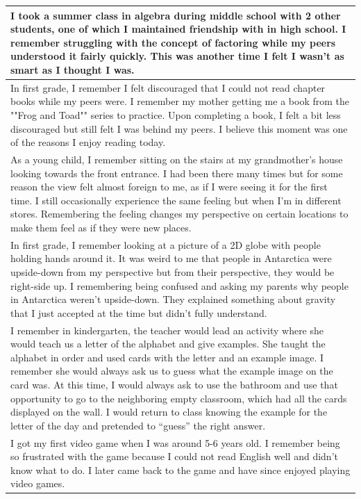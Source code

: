 \documentclass[
  .7em,
  letterpaper,
  DIV=11,
  numbers=noendperiod]{scrartcl}
\begin{document}
\begin{table}
\begin{tabular}{l}
\hline
I took a summer class in algebra during middle school with 2 other students, one of which I maintained friendship with in high school. I remember struggling with the concept of factoring while my peers understood it fairly quickly. This was another time I felt I wasn't as smart as I thought I was.\\
\hline
In first grade, I remember I felt discouraged that I could not read chapter books while my peers were. I remember my mother getting me a book from the ""Frog and Toad"" series to practice. Upon completing a book, I felt a bit less discouraged but still felt I was behind my peers. I believe this moment was one of the reasons I enjoy reading today.\\
\hline
As a young child, I remember sitting on the stairs at my grandmother's house looking towards the front entrance. I had been there many times but for some reason the view felt almost foreign to me, as if I were seeing it for the first time. I still occasionally experience the same feeling but when I'm in different stores. Remembering the feeling changes my perspective on certain locations to make them feel as if they were new places.\\
\hline
In first grade, I remember looking at a picture of a 2D globe with people holding hands around it. It was weird to me that people in Antarctica were upside-down from my perspective but from their perspective, they would be right-side up. I remembering being confused and asking my parents why people in Antarctica weren't upside-down. They explained something about gravity that I just accepted at the time but didn't fully understand.\\
\hline
I remember in kindergarten, the teacher would lead an activity where she would teach us a letter of the alphabet and give examples. She taught the alphabet in order and used cards with the letter and an example image. I remember she would always ask us to guess what the example image on the card was. At this time, I would always ask to use the bathroom and use that opportunity to go to the neighboring empty classroom, which had all the cards displayed on the wall. I would return to class knowing the example for the letter of the day and pretended to “guess” the right answer.\\
\hline
I got my first video game when I was around 5-6 years old. I remember being so frustrated with the game because I could not read English well and didn’t know what to do. I later came back to the game and have since enjoyed playing video games.\\

\end{tabular}
\end{table}
\end{document}
